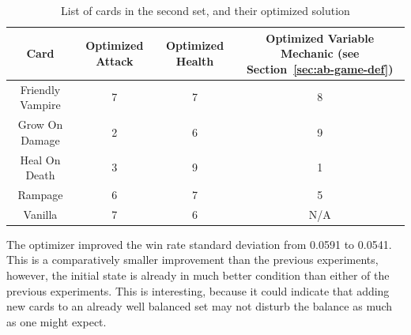 \begin{table}[t]
\centering
\begin{tabular}{||c c c c||} 
 \hline
 Card & Optimized Attack & Optimized Health & Optimized Variable Mechanic (see Section~\ref{sec:ab-game-def})\\ [0.5ex]
 \hline
 Friendly Vampire & 7 & 7 & 8 \\
 \hline
 Grow On Damage & 2 & 6 & 9 \\
 \hline
 Heal On Death & 3 & 9 & 1 \\
 \hline
 Rampage & 6 & 7 & 5 \\ 
 \hline
 Vanilla & 7 & 6 & N/A \\
 \hline
\end{tabular}
\caption{List of cards in the second set, and their optimized solution}
\label{tab:second_set}
\end{table}

The optimizer improved the win rate standard deviation from 0.0591 to 0.0541. This is a comparatively smaller improvement than the previous experiments, however, the initial state is already in much better condition than either of the previous experiments. This is interesting, because it could indicate that adding new cards to an already well balanced set may not disturb the balance as much as one might expect. 


